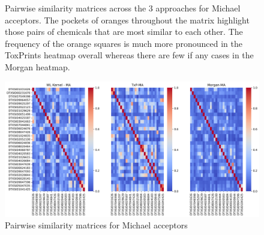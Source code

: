 \documentclass[
  super,
  preprint,
  3p]{elsarticle}
\begin{document}
\begin{figure}


\caption{\label{fig-ma}Pairwise similarity matrices across the 3
approaches for Michael acceptors. The pockets of oranges throughout the
matrix highlight those pairs of chemicals that are most similar to each
other. The frequency of the orange squares is much more pronounced in
the ToxPrints heatmap overall whereas there are few if any cases in the
Morgan heatmap.}

\end{figure}%

\begin{figure}[H]

{\centering \includegraphics{llna_sim_MA.png}

}

\caption{Pairwise similarity matrices for Michael acceptors}

\end{figure}%
\end{document}
